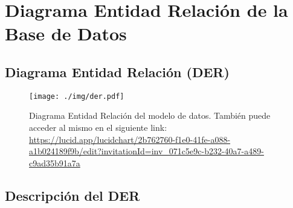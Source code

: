 
\section{Diagrama Entidad Relación de la Base de Datos}

\subsection{Diagrama Entidad Relación (DER)}

\begin{figure}[H]
    \centering
    \texttt{[image: ./img/der.pdf]}
    \caption{Diagrama Entidad Relación del modelo de datos. También puede acceder al mismo en el siguiente link: \url{https://lucid.app/lucidchart/2b762760-f1e0-41fe-a088-a1b024189f9b/edit?invitationId=inv_071c5e9c-b232-40a7-a489-c9ad35b91a7a}}
\end{figure}

\subsection{Descripción del DER}

